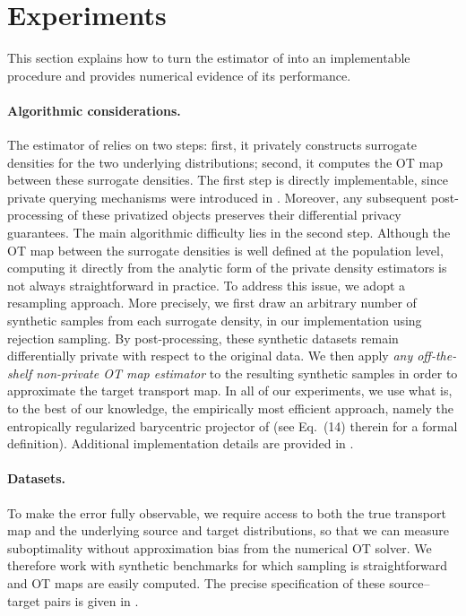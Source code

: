 \documentclass{article}
\newcommand{\1}{\mathds{1}}
\theoremstyle{plain}
\theoremstyle{definition}
\theoremstyle{remark}
\begin{document}
\section{Experiments}\label{sec:exp}

This section explains how to turn the estimator of  into an implementable procedure and provides numerical evidence of its performance.

\paragraph{Algorithmic considerations.}

The estimator of  relies on two steps: first, it privately constructs surrogate densities for the two underlying distributions; second, it computes the OT map between these surrogate densities. The first step is directly implementable, since private querying mechanisms were introduced in . Moreover, any subsequent post-processing of these privatized objects preserves their differential privacy guarantees.
The main algorithmic difficulty lies in the second step. Although the OT map between the surrogate densities is well defined at the population level, computing it directly from the analytic form of the private density estimators is not always straightforward in practice. To address this issue, we adopt a resampling approach.
More precisely, we first draw an arbitrary number of synthetic samples from each surrogate density, in our implementation using rejection sampling. By post-processing, these synthetic datasets remain differentially private with respect to the original data. We then apply \emph{any off-the-shelf non-private OT map estimator} to the resulting synthetic samples in order to approximate the target transport map.
In all of our experiments, we use what is, to the best of our knowledge, the empirically most efficient approach, namely the entropically regularized barycentric projector of \cite{pooladian2021entropic} (see Eq.~(14) therein for a formal definition). Additional implementation details are provided in .

\paragraph{Datasets.} To make the error fully observable, we require access to both the true transport map and the underlying source and target distributions, so that we can measure suboptimality without approximation bias from the numerical OT solver. We therefore work with synthetic benchmarks for which sampling is straightforward and
OT maps are easily computed. The precise specification of these source–target pairs
is given in .
\end{document}
